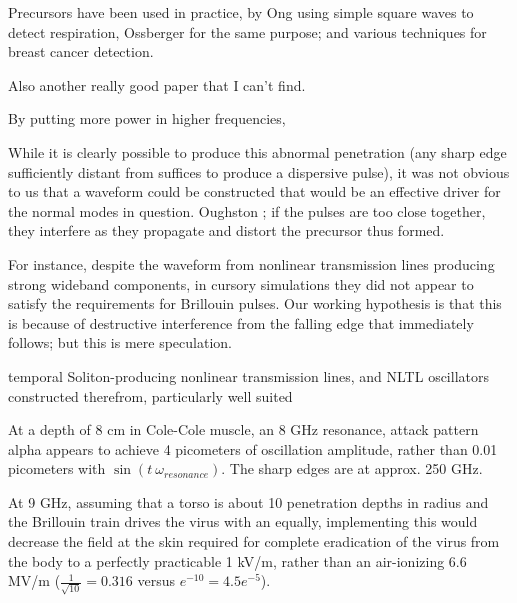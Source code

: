 \documentclass[paper.tex]{subfiles}
\begin{document}
Precursors have been used in practice, by Ong \cite{Detection2003} using simple square waves to detect respiration\footnotemark, Ossberger \cite{Noninvasive2004} for the same purpose; and various techniques for breast cancer detection. 


Also another really good paper that I can't find.


By putting more power in higher frequencies, 


While it is clearly possible to produce this abnormal penetration (any sharp edge sufficiently distant from  suffices to produce a dispersive pulse), it was not obvious to us that a waveform 
could be constructed that would be an effective driver for the normal modes in question. 
Oughston ; if the pulses are too close together, they interfere as they propagate and distort the precursor thus formed.


For instance, despite the waveform from nonlinear transmission lines producing strong wideband components, in cursory simulations they did not appear to satisfy the requirements for Brillouin pulses. Our working hypothesis is that this is because of destructive interference from the falling edge that immediately follows; but this is mere speculation.

temporal Soliton-producing nonlinear transmission lines, and NLTL oscillators constructed therefrom, particularly well suited 







At a depth of 8 cm in Cole-Cole muscle, an 8 GHz resonance, attack pattern alpha appears to achieve 4 picometers of oscillation amplitude, rather than 0.01 picometers with $\sin(t\ \omega_{resonance})$. The sharp edges are at approx. 250 GHz. 



At 9 GHz, assuming that a torso is about 10 penetration depths in radius and the Brillouin train 
drives the virus with an equally, implementing this would decrease the field at the skin required 
for complete eradication of the virus from the body to a perfectly practicable 1 kV/m, rather than 
an air-ionizing 6.6 MV/m ($\frac{1}{\sqrt{10}}=0.316$ versus $e^{-10}=4.5e^{-5}$). 
\end{document}
